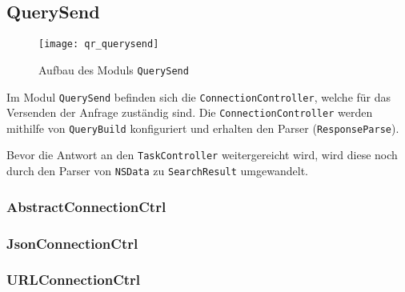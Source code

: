 
\subsection{QuerySend}

\begin{figure}[htb]
  	\texttt{[image: qr\_querysend]}
  	\caption{Aufbau des Moduls \lstinline|QuerySend|}
\end{figure}

Im Modul \lstinline|QuerySend| befinden sich die \lstinline|ConnectionController|, welche für das Versenden der Anfrage zuständig sind. Die \lstinline|ConnectionController| werden mithilfe von \lstinline|QueryBuild| konfiguriert und erhalten den Parser (\lstinline|ResponseParse|).

Bevor die Antwort an den \lstinline|TaskController| weitergereicht wird, wird diese noch durch den Parser von \lstinline|NSData| zu \lstinline|SearchResult| umgewandelt.

\subsubsection{AbstractConnectionCtrl}
\subsubsection{JsonConnectionCtrl}
\subsubsection{URLConnectionCtrl}

